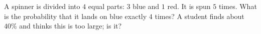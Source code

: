 A spinner is divided into $4$ equal parts: $3$ blue and $1$ red. It is spun $5$ times. What is the probability that it lands on blue exactly $4$ times? A student finds about $40\%$ and thinks this is too large; is it?

